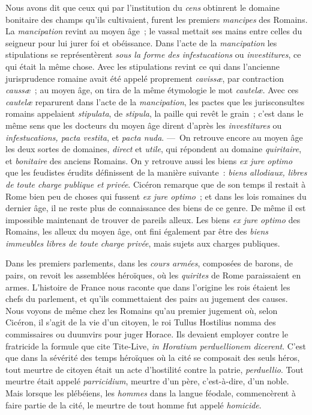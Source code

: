 \documentclass[french,twoside]{book} %
\begin{document}
Nous avons dit que ceux qui par l’institution du {\itshape cens} obtinrent le domaine bonitaire des champs  qu’ils cultivaient, furent les premiers {\itshape mancipes} des Romains. La {\itshape mancipation} revint au moyen âge ; le vassal mettait ses mains entre celles du seigneur pour lui jurer foi et obéissance. Dans l’acte de la {\itshape mancipation} les stipulations se représentèrent {\itshape sous la forme des infestucations} ou {\itshape investitures}, ce qui était la même chose. Avec les stipulations revint ce qui dans l’ancienne jurisprudence romaine avait été appelé proprement {\itshape cavissæ}, par contraction {\itshape caussæ} ; au moyen âge, on tira de la même étymologie le mot {\itshape cautelæ}. Avec ces {\itshape cautelæ} reparurent dans l’acte de la {\itshape mancipation}, les pactes que les jurisconsultes romains appelaient {\itshape stipulata}, de {\itshape stipula}, la paille qui revêt le grain ; c’est dans le même sens que les docteurs du moyen âge dirent d’après les {\itshape investitures} ou {\itshape infestucations, pacta vestita}, et {\itshape pacta nuda}. — On retrouve encore au moyen âge les deux sortes de domaines, {\itshape direct} et {\itshape utile}, qui répondent au domaine {\itshape quiritaire}, et {\itshape bonitaire} des anciens Romains. On y retrouve aussi les biens {\itshape ex jure optimo} que les feudistes érudits définissent de la manière suivante : {\itshape biens allodiaux, libres de toute charge publique et privée}. Cicéron remarque que de son temps il restait à Rome bien peu de choses qui fussent {\itshape ex jure optimo} ; et dans les lois romaines du dernier âge, il ne reste plus de connaissance des biens de ce genre. De même il est impossible maintenant de trouver de pareils alleux. Les biens {\itshape ex jure optimo} des Romains, les alleux du moyen âge, ont fini également par être des {\itshape biens immeubles libres de toute}  {\itshape charge privée}, mais sujets aux charges publiques.\par
Dans les premiers parlements, dans les {\itshape cours armées}, composées de barons, de pairs, on revoit les assemblées héroïques, où les {\itshape quirites} de Rome paraissaient en armes. L’histoire de France nous raconte que dans l’origine les rois étaient les chefs du parlement, et qu’ils commettaient des pairs au jugement des causes. Nous voyons de même chez les Romains qu’au premier jugement où, selon Cicéron, il s’agit de la vie d’un citoyen, le roi Tullus Hostilius nomma des commissaires ou duumvirs pour juger Horace. Ils devaient employer contre le fratricide la formule que cite Tite-Live, \emph{{\itshape in Horatium perduellionem dicerent}}. C’est que dans la sévérité des temps héroïques où la cité se composait des seuls héros, tout meurtre de citoyen était un acte d’hostilité contre la patrie, {\itshape perduellio}. Tout meurtre était appelé {\itshape parricidium}, meurtre d’un père, c’est-à-dire, d’un noble. Mais lorsque les plébéiens, les {\itshape hommes} dans la langue féodale, commencèrent à faire partie de la cité, le meurtre de tout homme fut appelé {\itshape homicide}.\par
\end{document}

